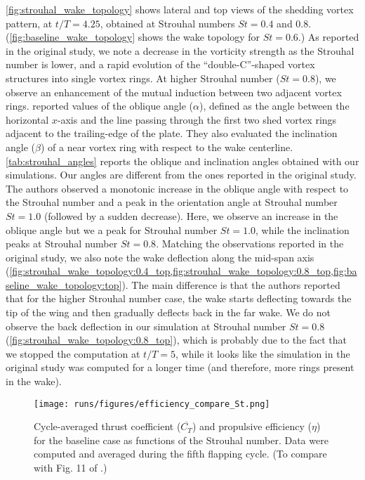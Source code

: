 \cref{fig:strouhal_wake_topology} shows lateral and top views of the shedding vortex pattern, at $t/T = 4.25$, obtained at Strouhal numbers $St = 0.4$ and $0.8$.
(\cref{fig:baseline_wake_topology} shows the wake topology for $St = 0.6$.)
As reported in the original study, we note a decrease in the vorticity strength as the Strouhal number is lower, and a rapid evolution of the ``double-C''-shaped vortex structures into single vortex rings.
At higher Strouhal number ($St = 0.8$), we observe an enhancement of the mutual induction between two adjacent vortex rings.
\citet{li_dong_2016} reported values of the oblique angle ($\alpha$), defined as the angle between the horizontal $x$-axis and the line passing through the first two shed vortex rings adjacent to the trailing-edge of the plate.
They also evaluated the inclination angle ($\beta$) of a near vortex ring with respect to the wake centerline.
\cref{tab:strouhal_angles} reports the oblique and inclination angles obtained with our simulations.
Our angles are different from the ones reported in the original study.
The authors observed a monotonic increase in the oblique angle with respect to the Strouhal number and a peak in the orientation angle at Strouhal number $St = 1.0$ (followed by a sudden decrease).
Here, we observe an increase in the oblique angle but we a peak for Strouhal number $St = 1.0$, while the inclination peaks at Strouhal number $St = 0.8$.
Matching the observations reported in the original study, we also note the wake deflection along the mid-span axis (\cref{fig:strouhal_wake_topology:0.4_top,fig:strouhal_wake_topology:0.8_top,fig:baseline_wake_topology:top}).
The main difference is that the authors reported that for the higher Strouhal number case, the wake starts deflecting towards the tip of the wing and then gradually deflects back in the far wake.
We do not observe the back deflection in our simulation at Strouhal number $St = 0.8$ (\cref{fig:strouhal_wake_topology:0.8_top}), which is probably due to the fact that we stopped the computation at $t/T = 5$, while it looks like the simulation in the original study was computed for a longer time (and therefore, more rings present in the wake).

\begin{figure}
  \centering
  \texttt{[image: runs/figures/efficiency\_compare\_St.png]}
  \caption{Cycle-averaged thrust coefficient ($\overline{C_T}$) and propulsive efficiency ($\eta$) for the baseline case as functions of the Strouhal number. Data were computed and averaged during the fifth flapping cycle. (To compare with Fig. 11 of \citet{li_dong_2016}.)}
  \label{fig:strouhal_propulsive_efficiency}
\end{figure}


